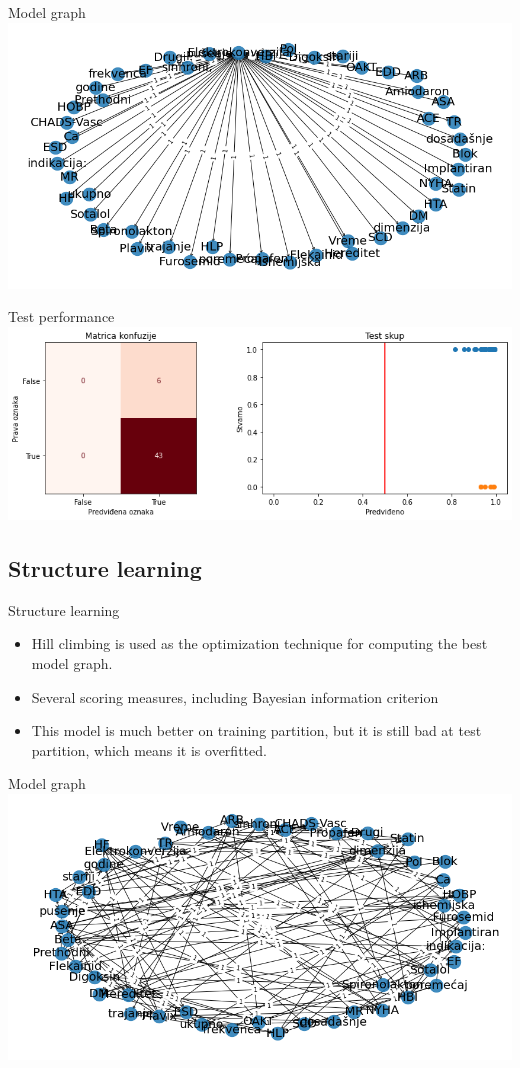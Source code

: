 \documentclass[hyperref={bookmarks=false}]{beamer}
\begin{document}
\begin{frame}{Model graph}
\includegraphics[width=\textwidth]{naive1.png}
\end{frame}

\begin{frame}{Test performance}
\includegraphics[width=\textwidth]{naive2.png}
\end{frame}

\subsection{Structure learning}
\begin{frame}{Structure learning}
\begin{itemize}
    \item Hill climbing is used as the optimization technique for computing the best model graph.
    \item Several scoring measures, including Bayesian information criterion
    \item This model is much better on training partition, but it is still bad at test partition, which means it is overfitted.
\end{itemize}
\end{frame}

\begin{frame}{Model graph}
\includegraphics[width=\textwidth]{learn1.png}
\end{frame}
\end{document}
